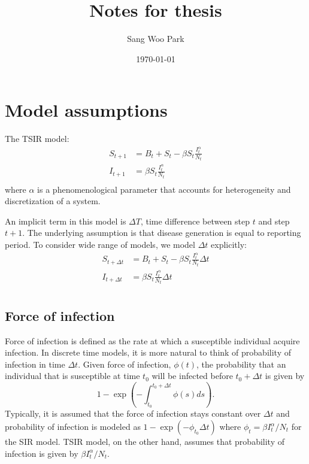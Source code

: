 \documentclass{article}
\title{Notes for thesis}
\date{\today}
\author{Sang Woo Park}
\begin{document}
\maketitle

\section{Model assumptions}

The TSIR model:
\begin{equation}
\begin{aligned}
S_{t+1} &= B_t + S_t - \beta S_t \frac{I_t^\alpha}{N_t}\\
I_{t+1} &= \beta S_t \frac{I_t^\alpha}{N_t}\\
\end{aligned}
\end{equation}
where $\alpha$ is a phenomenological parameter that accounts for heterogeneity and discretization of a system.

An implicit term in this model is $\Delta T$, time difference between step $t$ and step $t+1$. The underlying assumption is that disease generation is equal to reporting period. To consider wide range of models, we model $\Delta t$ explicitly:
\begin{equation}
\begin{aligned}
S_{t+\Delta t} &= B_t + S_t - \beta S_t \frac{I_t^\alpha}{N_t} \Delta t\\
I_{t+\Delta t} &= \beta S_t \frac{I_t^\alpha}{N_t} \Delta t\\
\end{aligned}
\end{equation}

\subsection{Force of infection}

Force of infection is defined as the rate at which a susceptible individual acquire infection.
In discrete time models, it is more natural to think of probability of infection in time $\Delta t$.
Given force of infection, $\phi(t)$, the probability that an individual that is susceptible at time $t_0$ will be infected before $t_0 + \Delta t$ is given by
\begin{equation}
1 - \exp\left(-\int_{t_0}^{t_0 + \Delta t} \phi(s) ds\right).
\end{equation}
Typically, it is assumed that the force of infection stays constant over $\Delta t$ and probability of infection is modeled as $1 - \exp(- \phi_{t_0} \Delta t)$ where $\phi_t = \beta I_t^\alpha/N_t$ for the SIR model.
TSIR model, on the other hand, assumes that probability of infection is given by $\beta I_t^\alpha/N_t$.
\end{document}

